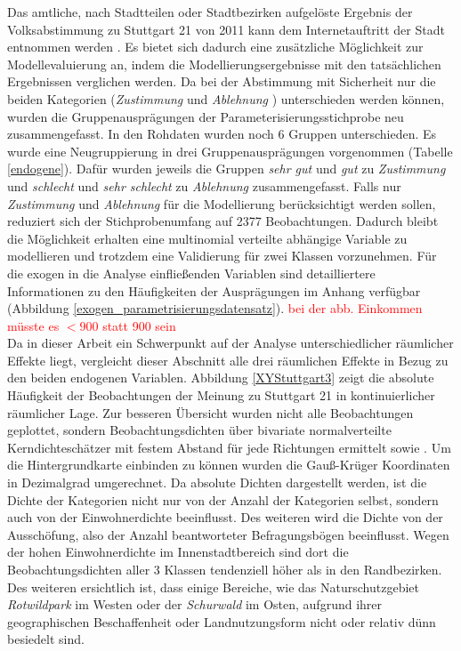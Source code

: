 \documentclass{Vorlage}
\begin{document}
Das amtliche, nach Stadtteilen oder Stadtbezirken aufgelöste Ergebnis der Volksabstimmung zu Stuttgart 21 von 2011 kann 
dem Internetauftritt der Stadt entnommen werden \cite{Amt}. Es bietet sich dadurch eine zusätzliche Möglichkeit zur 
Modellevaluierung an, indem die Modellierungsergebnisse mit den tatsächlichen Ergebnissen verglichen werden. Da bei der 
Abstimmung mit Sicherheit nur die beiden Kategorien (\textit{Zustimmung} und \textit{Ablehnung }) unterschieden werden 
können, wurden die Gruppenausprägungen der Parameterisierungsstichprobe neu zusammengefasst. In den Rohdaten wurden noch 
6 Gruppen unterschieden. Es wurde eine Neugruppierung in drei Gruppenausprägungen vorgenommen (Tabelle \ref{endogene}). Dafür wurden jeweils die 
Gruppen \textit{sehr gut} und \textit{gut} zu \textit{Zustimmung} und \textit{schlecht} und \textit{sehr schlecht} zu 
\textit{Ablehnung} zusammengefasst. Falls nur \textit{Zustimmung} und \textit{Ablehnung} für die Modellierung 
berücksichtigt werden sollen, reduziert sich der Stichprobenumfang auf 2377 Beobachtungen. Dadurch bleibt die 
Möglichkeit erhalten eine multinomial verteilte abhängige Variable zu modellieren und trotzdem eine Validierung für 
zwei Klassen vorzunehmen. Für die exogen in die Analyse einfließenden Variablen sind detailliertere Informationen zu den 
Häufigkeiten der Ausprägungen im Anhang verfügbar (Abbildung \ref{exogen_parametrisierungsdatensatz}). 
\textcolor{red}{bei der abb. Einkommen müsste es $<900$ statt 900 sein}\\

Da in dieser Arbeit ein Schwerpunkt auf der Analyse unterschiedlicher räumlicher Effekte liegt, vergleicht dieser Abschnitt alle drei räumlichen Effekte in Bezug zu den beiden endogenen Variablen. Abbildung \ref{XYStuttgart3} zeigt die absolute Häufigkeit der Beobachtungen der Meinung zu Stuttgart 21 in kontinuierlicher räumlicher Lage. Zur besseren Übersicht wurden nicht alle Beobachtungen geplottet, sondern Beobachtungsdichten über bivariate normalverteilte Kerndichteschätzer mit festem Abstand für jede Richtungen ermittelt \cite{ggplot} sowie \cite{MASS}. Um die Hintergrundkarte einbinden zu können wurden die Gauß-Krüger Koordinaten in Dezimalgrad umgerechnet. Da absolute Dichten dargestellt werden, ist die Dichte der Kategorien nicht nur von der Anzahl der Kategorien selbst, sondern auch von der Einwohnerdichte beeinflusst. Des weiteren wird die Dichte von der Ausschöfung, also der Anzahl beantworteter Befragungsbögen beeinflusst. Wegen der hohen Einwohnerdichte im Innenstadtbereich sind dort die Beobachtungsdichten aller 3 Klassen tendenziell höher als in den Randbezirken. Des weiteren ersichtlich ist, dass einige Bereiche, wie das Naturschutzgebiet \textit{Rotwildpark} im Westen oder der \textit{Schurwald} im Osten, aufgrund ihrer geographischen Beschaffenheit oder Landnutzungsform nicht oder relativ dünn besiedelt sind.
\end{document}
